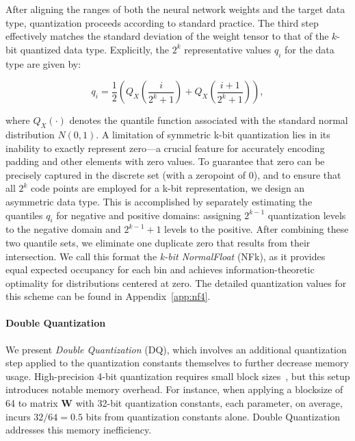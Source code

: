 After aligning the ranges of both the neural network weights and the target data type, quantization proceeds according to standard practice. The third step effectively matches the standard deviation of the weight tensor to that of the $k$-bit quantized data type. Explicitly, the $2^k$ representative values $q_i$ for the data type are given by:

\begin{equation}
q_i  = \frac{1}{2}\left( Q_X\left(\frac{i}{2^k+1}\right) + Q_X\left(\frac{i+1}{2^k+1}\right)\right),
\end{equation}

where $Q_X(\cdot)$ denotes the quantile function associated with the standard normal distribution $N(0,1)$. A limitation of symmetric k-bit quantization lies in its inability to exactly represent zero—a crucial feature for accurately encoding padding and other elements with zero values. To guarantee that zero can be precisely captured in the discrete set (with a zeropoint of $0$), and to ensure that all $2^k$ code points are employed for a k-bit representation, we design an asymmetric data type. This is accomplished by separately estimating the quantiles $q_i$ for negative and positive domains: assigning $2^{k-1}$ quantization levels to the negative domain and $2^{k-1}+1$ levels to the positive. After combining these two quantile sets, we eliminate one duplicate zero that results from their intersection. We call this format the \emph{k-bit NormalFloat} (NFk), as it provides equal expected occupancy for each bin and achieves information-theoretic optimality for distributions centered at zero. The detailed quantization values for this scheme can be found in Appendix~\ref{app:nf4}.

\paragraph{Double Quantization{}}

We present \emph{Double Quantization} (DQ), which involves an additional quantization step applied to the quantization constants themselves to further decrease memory usage. High-precision 4-bit quantization requires small block sizes~\citep{dettmers2022case}, but this setup introduces notable memory overhead. For instance, when applying a blocksize of 64 to matrix $\mathbf{W}$ with 32-bit quantization constants, each parameter, on average, incurs $32/64 = 0.5$ bits from quantization constants alone. Double Quantization addresses this memory inefficiency.

